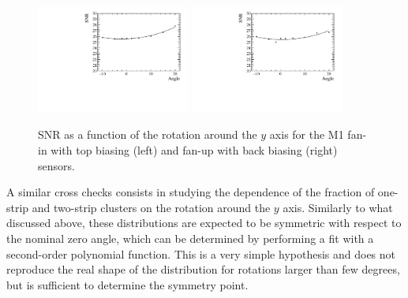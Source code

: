 \begin{figure}[]
\centering
\includegraphics[width=0.45\textwidth]{figs/SNRvsAngle/cSNRvsAngle_M1_FanIn_Top.pdf}
\includegraphics[width=0.45\textwidth]{figs/SNRvsAngle/cSNRvsAngle_M1_FanUp_Back.pdf}
\caption[SNR as a function of the rotation around the $y$ axis.]{SNR as a function of the rotation around the $y$ axis for the M1 fan-in with top biasing (left) and fan-up with back biasing (right) sensors.}
\label{fig:SNRvsAngle}
\end{figure}

A similar cross checks consists in studying the dependence of the fraction of one-strip and two-strip clusters on the rotation around the $y$ axis. Similarly to what discussed above, these distributions are expected to be symmetric with respect to the nominal zero angle, which can be determined by performing a fit with a second-order polynomial function. This is a very simple hypothesis and does not reproduce the real shape of the distribution for rotations larger than few degrees, but is sufficient to determine the symmetry point.


